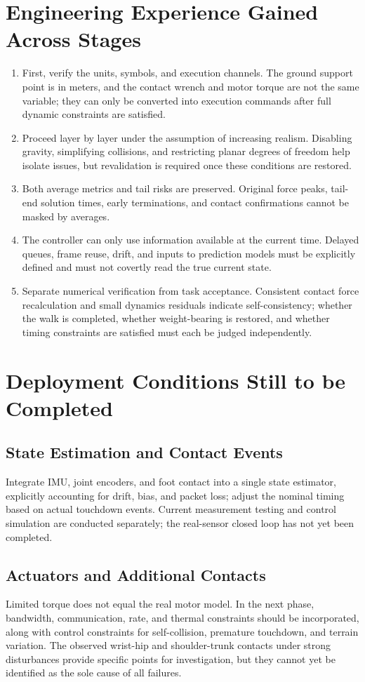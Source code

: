\section{Engineering Experience Gained Across Stages}
\begin{enumerate}
\item First, verify the units, symbols, and execution channels. The ground support point is in meters, and the contact wrench and motor torque are not the same variable; they can only be converted into execution commands after full dynamic constraints are satisfied.
\item Proceed layer by layer under the assumption of increasing realism. Disabling gravity, simplifying collisions, and restricting planar degrees of freedom help isolate issues, but revalidation is required once these conditions are restored.
\item Both average metrics and tail risks are preserved. Original force peaks, tail-end solution times, early terminations, and contact confirmations cannot be masked by averages.
\item The controller can only use information available at the current time. Delayed queues, frame reuse, drift, and inputs to prediction models must be explicitly defined and must not covertly read the true current state.
\item Separate numerical verification from task acceptance. Consistent contact force recalculation and small dynamics residuals indicate self-consistency; whether the walk is completed, whether weight-bearing is restored, and whether timing constraints are satisfied must each be judged independently.
\end{enumerate}
\section{Deployment Conditions Still to be Completed}
\subsection{State Estimation and Contact Events}
Integrate IMU, joint encoders, and foot contact into a single state estimator, explicitly accounting for drift, bias, and packet loss; adjust the nominal timing based on actual touchdown events. Current measurement testing and control simulation are conducted separately; the real-sensor closed loop has not yet been completed.
\subsection{Actuators and Additional Contacts}
Limited torque does not equal the real motor model. In the next phase, bandwidth, communication, rate, and thermal constraints should be incorporated, along with control constraints for self-collision, premature touchdown, and terrain variation. The observed wrist-hip and shoulder-trunk contacts under strong disturbances provide specific points for investigation, but they cannot yet be identified as the sole cause of all failures.

